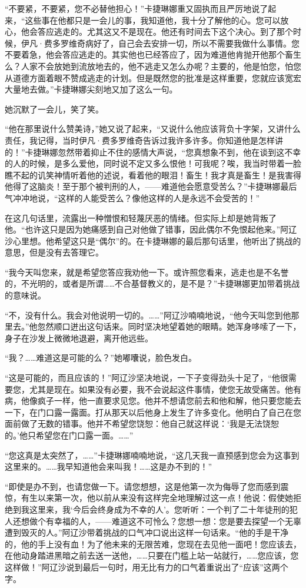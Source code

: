 \par “不要紧，不要紧，您不必替他担心！”卡捷琳娜重又固执而且严厉地说了起来，“这些事在他都只是一会儿的事，我知道他，我十分了解他的心。您可以放心，他会答应逃走的。尤其这又不是现在。他还有时间去下这个决心。到了那个时候，伊凡·费多罗维奇病好了，自己会去安排一切，所以不需要我做什么事情。您不要着急，他会答应逃走的。其实他也已经答应了，因为难道他肯抛开他那个畜生么？人家不会放她到流放地去的，他不逃走又怎么办呢？主要的，他是怕您，怕您从道德方面着眼不赞成逃走的计划。但是既然您的批准是这样重要，您就应该宽宏大量地去做。”卡捷琳娜尖刻地又加了这么一句。
\par 她沉默了一会儿，笑了笑。
\par “他在那里说什么赞美诗，”她又说了起来，“又说什么他应该背负十字架，又讲什么责任，我记得，当时伊凡·费多罗维奇告诉过我许多许多。你知道他是怎样讲的！”卡捷琳娜忽然带着抑止不住的感情大声说，“您真想象不到，他在谈到这不幸的人的时候，是多么爱他，同时说不定又多么恨他！可我呢？唉，我当时带着一脸瞧不起的讥笑神情听着他的述说，看着他的眼泪！畜生！我才真是畜生！是我害得他得了这脑炎！至于那个被判刑的人，——难道他会愿意受苦么？”卡捷琳娜最后气冲冲地说，“这样的人能受苦么？像他这样的人是永远不会受苦的！”
\par 在这几句话里，流露出一种憎恨和轻蔑厌恶的情绪。但实际上却是她背叛了他。“也许这只是因为她痛感到自己对他做了错事，因此偶尔不免恨起他来。”阿辽沙心里想。他希望这只是“偶尔”的。在卡捷琳娜的最后那句话里，他听出了挑战的意思，但是没有去答理它。
\par “我今天叫您来，就是希望您答应我劝他一下。或许照您看来，逃走也是不名誉的，不光明的，或者是所谓……不合基督教义的，是不是？”卡捷琳娜更加带着挑战的意味说。
\par “不，没有什么。我会对他说明一切的。……”阿辽沙喃喃地说，“他今天叫您到他那里去。”他忽然顺口迸出这句话来。同时坚决地望着她的眼睛。她浑身哆嗦了一下，身子在沙发上微微地退避，离开他远些。
\par “我？……难道这是可能的么？”她嘟囔说，脸色发白。
\par “这是可能的，而且应该的！”阿辽沙坚决地说，一下子变得劲头十足了，“他很需要您，尤其是现在。如果没有必要，我不会说起这件事情，使您无故受痛苦。他有病，他像疯子一样，他一直要求见您。他并不想请您前去和他和解，他只要您能去一下，在门口露一露面。打从那天以后他身上发生了许多变化。他明白了自己在您面前做了无数的错事。他并不希望您饶恕：他自己就这样说：‘我是无法饶恕的。’他只希望您在门口露一面。……”
\par “您这真是太突然了，……”卡捷琳娜喃喃地说，“这几天我一直预感到您会为这事到这里来的。……我早知道他会来叫我！……这是办不到的！”
\par “即使是办不到，也请您做一下。请您想想，这是他第一次为侮辱了您而感到震惊，有生以来第一次，他以前从来没有这样完全地理解过这一点！他说：假使她拒绝到我这里来，我‘今后会终身成为不幸的人’。您听听：一个判了二十年徒刑的犯人还想做个有幸福的人，——难道这不可怜么？您想一想：您是要去探望一个无辜遭到毁灭的人。”阿辽沙带着挑战的口气冲口说出这样一句话来。“他的手是干净的，他的手上没有血！为了他未来的无限苦难，您现在去见他一面吧！您应该去，在他动身踏进黑暗之前去送一送他，……只要在门槛上站一站就行，……您应该，您这样做！”阿辽沙说到最后一句时，用无比有力的口气着重说出了“应该”这两个字。
